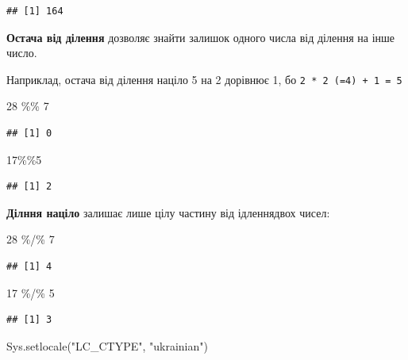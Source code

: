 \documentclass[
]{book}
\newenvironment{Shaded}{\begin{snugshade}}{\end{snugshade}}
\newcommand{\DecValTok}[1]{\textcolor[rgb]{0.00,0.00,0.81}{#1}}
\newcommand{\FunctionTok}[1]{\textcolor[rgb]{0.00,0.00,0.00}{#1}}
\newcommand{\NormalTok}[1]{#1}
\newcommand{\SpecialCharTok}[1]{\textcolor[rgb]{0.00,0.00,0.00}{#1}}
\newcommand{\StringTok}[1]{\textcolor[rgb]{0.31,0.60,0.02}{#1}}
\begin{document}
\begin{verbatim}
## [1] 164
\end{verbatim}

\textbf{Остача від ділення} дозволяє знайти залишок одного числа від ділення на інше число.

Наприклад, остача від ділення націло 5 на 2 дорівнює 1, бо \texttt{2\ *\ 2\ (=4)\ +\ 1\ =\ 5}

\begin{Shaded}
\begin{Highlighting}[]
\DecValTok{28} \SpecialCharTok{\%\%} \DecValTok{7}
\end{Highlighting}
\end{Shaded}

\begin{verbatim}
## [1] 0
\end{verbatim}

\begin{Shaded}
\begin{Highlighting}[]
\DecValTok{17}\SpecialCharTok{\%\%}\DecValTok{5}
\end{Highlighting}
\end{Shaded}

\begin{verbatim}
## [1] 2
\end{verbatim}

\textbf{Ділння націло} залишає лише цілу частину від ідленнядвох чисел:

\begin{Shaded}
\begin{Highlighting}[]
\DecValTok{28} \SpecialCharTok{\%/\%} \DecValTok{7}
\end{Highlighting}
\end{Shaded}

\begin{verbatim}
## [1] 4
\end{verbatim}

\begin{Shaded}
\begin{Highlighting}[]
\DecValTok{17} \SpecialCharTok{\%/\%} \DecValTok{5} 
\end{Highlighting}
\end{Shaded}

\begin{verbatim}
## [1] 3
\end{verbatim}

\begin{Shaded}
\begin{Highlighting}[]
\FunctionTok{Sys.setlocale}\NormalTok{(}\StringTok{"LC\_CTYPE"}\NormalTok{, }\StringTok{"ukrainian"}\NormalTok{)}
\end{Highlighting}
\end{Shaded}
\end{document}
